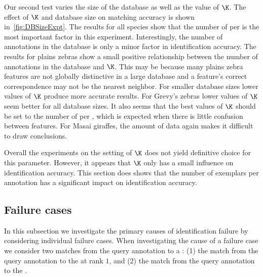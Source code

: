         Our second test varies the size of the database as well as the
          value of $\K$.
        The effect of $\K$ and database size on matching accuracy is
          shown in~\cref{fig:DBSizeExpt}.
        The results for all species show that the number of
          \exemplars{} per \name{} is the most important factor in this
          experiment.
        Interestingly, the number of annotations in the database is
          only a minor factor in identification accuracy.
        The results for plains zebras show a small positive
          relationship between the number of annotations in the database
          and $\K$.
        This may be because many plains zebra features are not globally
          distinctive in a large database and a feature's correct
          correspondence may not be the nearest neighbor.
        For smaller database sizes lower values of $\K$ produce more
          accurate results.
        For Grevy's zebras lower values of $\K$ seem better for all
          database sizes.
        It also seems that the best values of $\K$ should be set to the
          number of \exemplars{} per \name{}, which is expected when
          there is little confusion between features.
        For Masai giraffes, the amount of data again makes it difficult
          to draw conclusions.

        \DBSizeExpt{}

        Overall the experiments on the setting of $\K$ does not yield
          definitive choice for this parameter.
        However, it appears that $\K$ only has a small influence on
          identification accuracy.
        This section does shows that the number of exemplars per
          annotation has a significant impact on identification accuracy.

    \subsection{Failure cases}\label{sub:exptfail}  
        
        In this subsection we investigate the primary causes of
          identification failure by considering individual failure cases.
        When investigating the cause of a failure case we consider two
          matches from the query annotation to a \name{}:
        (1) the match from the query annotation to the \groundfalse{}
          \name{} at rank $1$, and
        (2) the match from the query annotation to the \groundtrue{}
          \name{}.


